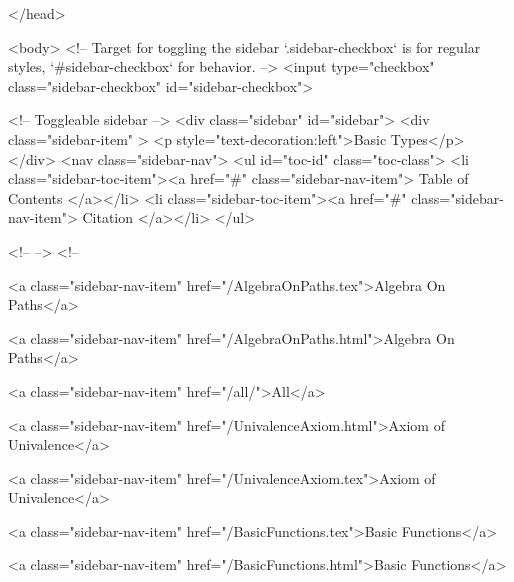   
</head>




  <body>
    <!-- Target for toggling the sidebar `.sidebar-checkbox` is for regular
     styles, `#sidebar-checkbox` for behavior. -->
<input type="checkbox" class="sidebar-checkbox" id="sidebar-checkbox">

<!-- Toggleable sidebar -->
<div class="sidebar" id="sidebar">
  <div class="sidebar-item" >
    <p style="text-decoration:left">Basic Types</p>
  </div>
  <nav class="sidebar-nav">
    <ul id="toc-id" class="toc-class">
  <li class="sidebar-toc-item"><a href="#" class="sidebar-nav-item"> Table of Contents </a></li>
  <li class="sidebar-toc-item"><a href="#" class="sidebar-nav-item"> Citation </a></li>
</ul>


    <!--  -->
    <!-- 
      
    
      
    
      
    
      
        
      
    
      
        
          <a class="sidebar-nav-item" href="/AlgebraOnPaths.tex">Algebra On Paths</a>
        
      
    
      
        
          <a class="sidebar-nav-item" href="/AlgebraOnPaths.html">Algebra On Paths</a>
        
      
    
      
        
          <a class="sidebar-nav-item" href="/all/">All</a>
        
      
    
      
        
          <a class="sidebar-nav-item" href="/UnivalenceAxiom.html">Axiom of Univalence</a>
        
      
    
      
        
          <a class="sidebar-nav-item" href="/UnivalenceAxiom.tex">Axiom of Univalence</a>
        
      
    
      
        
          <a class="sidebar-nav-item" href="/BasicFunctions.tex">Basic Functions</a>
        
      
    
      
        
          <a class="sidebar-nav-item" href="/BasicFunctions.html">Basic Functions</a>
        
